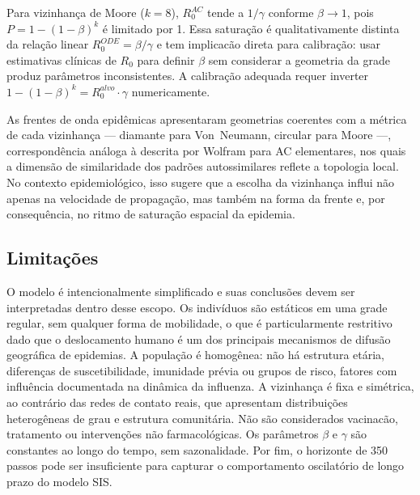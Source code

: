 \documentclass[fleqn,10pt]{wlscirep}
\begin{document}
Para vizinhan\c{c}a de Moore ($k = 8$), $R_0^{AC}$ tende a $1/\gamma$ conforme $\beta \to 1$, pois $P = 1-(1-\beta)^k$ \'{e} limitado por 1. Essa satura\c{c}\~{a}o \'{e} qualitativamente distinta da rela\c{c}\~{a}o linear $R_0^{ODE} = \beta/\gamma$ e tem implicac\~{a}o direta para calibra\c{c}\~{a}o: usar estimativas cl\'{i}nicas de $R_0$ para definir $\beta$ sem considerar a geometria da grade produz par\^{a}metros inconsistentes. A calibra\c{c}\~{a}o adequada requer inverter $1-(1-\beta)^k = R_0^{alvo} \cdot \gamma$ numericamente.

As frentes de onda epidêmicas apresentaram geometrias coerentes com a m\'{e}trica de cada vizinhan\c{c}a --- diamante para Von~Neumann, circular para Moore ---, correspond\^{e}ncia an\'{a}loga \`{a} descrita por Wolfram\cite{Wolfram:2002} para AC elementares, nos quais a dimens\~{a}o de similaridade dos padr\~{o}es autossimilares reflete a topologia local. No contexto epidemiol\'{o}gico, isso sugere que a escolha da vizinhan\c{c}a influi n\~{a}o apenas na velocidade de propaga\c{c}\~{a}o, mas tamb\'{e}m na forma da frente e, por consequ\^{e}ncia, no ritmo de satura\c{c}\~{a}o espacial da epidemia.

\subsection*{Limita\c{c}\~{o}es}

O modelo \'{e} intencionalmente simplificado e suas conclus\~{o}es devem ser interpretadas dentro desse escopo. Os indiv\'{i}duos s\~{a}o est\'{a}ticos em uma grade regular, sem qualquer forma de mobilidade, o que \'{e} particularmente restritivo dado que o deslocamento humano \'{e} um dos principais mecanismos de difus\~{a}o geogr\'{a}fica de epidemias\cite{Keeling:2008}. A popula\c{c}\~{a}o \'{e} homog\^{e}nea: n\~{a}o h\'{a} estrutura et\'{a}ria, diferen\c{c}as de suscetibilidade, imunidade pr\'{e}via ou grupos de risco, fatores com influ\^{e}ncia documentada na din\^{a}mica da influenza\cite{Biggerstaff:2014}. A vizinhan\c{c}a \'{e} fixa e sim\'{e}trica, ao contr\'{a}rio das redes de contato reais, que apresentam distribui\c{c}\~{o}es heterog\^{e}neas de grau e estrutura comunit\'{a}ria. N\~{a}o s\~{a}o considerados vacinac\~{a}o, tratamento ou interven\c{c}\~{o}es n\~{a}o farmacol\'{o}gicas. Os par\^{a}metros $\beta$ e $\gamma$ s\~{a}o constantes ao longo do tempo, sem sazonalidade. Por fim, o horizonte de 350 passos pode ser insuficiente para capturar o comportamento oscilatório de longo prazo do modelo SIS.
\end{document}
